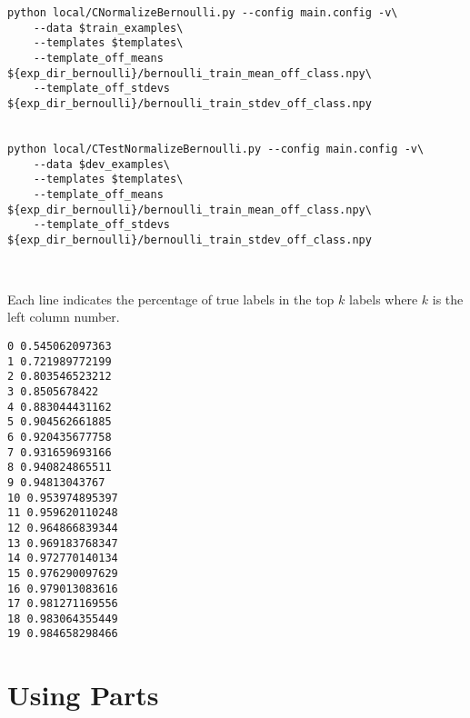\documentclass{article}
\begin{document}
\begin{verbatim}
python local/CNormalizeBernoulli.py --config main.config -v\
    --data $train_examples\
    --templates $templates\
    --template_off_means ${exp_dir_bernoulli}/bernoulli_train_mean_off_class.npy\
    --template_off_stdevs ${exp_dir_bernoulli}/bernoulli_train_stdev_off_class.npy


python local/CTestNormalizeBernoulli.py --config main.config -v\
    --data $dev_examples\
    --templates $templates\
    --template_off_means ${exp_dir_bernoulli}/bernoulli_train_mean_off_class.npy\
    --template_off_stdevs ${exp_dir_bernoulli}/bernoulli_train_stdev_off_class.npy



\end{verbatim}



Each line indicates the percentage of true labels in the top $k$
labels where $k$ is the left column number.
\begin{verbatim}
0 0.545062097363
1 0.721989772199
2 0.803546523212
3 0.8505678422
4 0.883044431162
5 0.904562661885
6 0.920435677758
7 0.931659693166
8 0.940824865511
9 0.94813043767
10 0.953974895397
11 0.959620110248
12 0.964866839344
13 0.969183768347
14 0.972770140134
15 0.976290097629
16 0.979013083616
17 0.981271169556
18 0.983064355449
19 0.984658298466
\end{verbatim}


\section{Using Parts}
\end{document}
